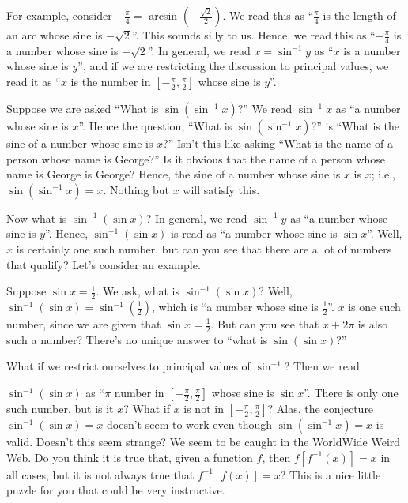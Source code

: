 \documentclass[english]{book}
\begin{document}
\vspace{0.3cm}

For example, consider $-\frac{\pi}{4} =$ arcsin $(-\frac{\sqrt{2}}{2})$. We read this as ``$\frac{\pi}{4}$ is the length of an arc whose sine is $-\sqrt{2}$''. This sounds silly to us. Hence, we read this as ``$-\frac{\pi}{4}$ is a number whose sine is $-\sqrt{2}$''. In general, we read $x = \sin^{-1} y$ as ``$x$ is a number whose sine is $y$'', and if we are restricting the discussion to principal values, we read it as ``$x$ is the number in $[-\frac{\pi}{2},\frac{\pi}{2}]$ whose sine is $y$''.

Suppose we are asked ``What is $\sin(\sin^{-1}x)$?'' We read $\sin^{-1}x$ as ``a number whose sine is $x$''. Hence the question, ``What is $\sin(\sin^{-1}x)$?'' is ``What is the sine of a number whose sine is $x$?'' Isn't this like asking ``What is the name of a person whose name is George?'' Is it obvious that the name of a person whose name is George is George? Hence, the sine of a number whose sine is $x$ is $x$; i.e., $\sin(\sin^{-1}x) = x$. Nothing but $x$ will satisfy this.

Now what is $\sin^{-1}(\sin x)$? In general, we read $\sin^{-1} y$ as ``a number whose sine is $y$''. Hence, $\sin^{-1}(\sin x)$ is read as ``a number whose sine is $\sin x$''. Well, $x$ is certainly one such number, but can you see that there are a lot of numbers that qualify? Let's consider an example. 

\vspace{0.3cm}

Suppose $\sin x = \frac{1}{2}$. We ask, what is $\sin^{-1}(\sin x)$? Well, $\sin^{-1}(\sin x) = \sin^{-1}(\frac{1}{2})$, which is ``a number whose sine is $\frac{1}{2}$''. $x$ is one such number, since we are given that $\sin x = \frac{1}{2}$. But can you see that $x+2\pi$ is also such a number? There's no unique answer to ``what is $\sin(\sin x)$?''

What if we restrict ourselves to principal values of $\sin^{-1}$? Then we read 

$\sin^{-1} (\sin x)$ as ``$\pi$ number in $[-\frac{\pi}{2},\frac{\pi}{2}]$ whose sine is $\sin x$''. There is only one such number, but is it $x$? What if $x$ is not in $[-\frac{\pi}{2},\frac{\pi}{2}]$? Alas, the conjecture $\sin^{-1}(\sin x) = x$ doesn't seem to work even though $\sin(\sin^{-1}x) = x$ is valid. Doesn't this seem strange? We seem to be caught in the WorldWide Weird Web. Do you think it is true that, given a function $f$, then $f[f^{-1}(x)] = x$ in all cases, but it is not always true that $f^{-1}[f(x)] = x$? This is a nice little puzzle for you that could be very instructive.
\end{document}
